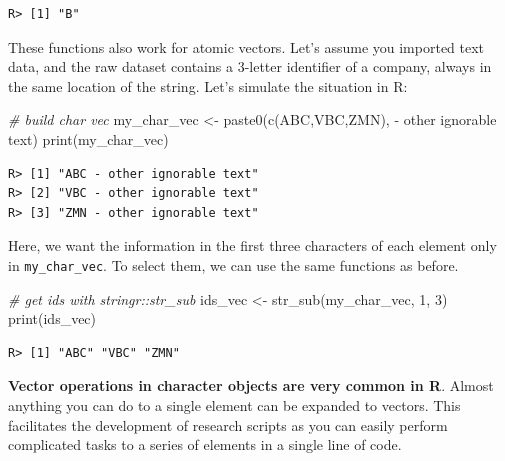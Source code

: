 \documentclass[
  12pt,
]{book}
\newenvironment{Shaded}{\begin{snugshade}}{\end{snugshade}}
\newcommand{\CommentTok}[1]{\textcolor[rgb]{0.37,0.37,0.37}{\textit{#1}}}
\newcommand{\DecValTok}[1]{\textcolor[rgb]{0.06,0.06,0.06}{#1}}
\newcommand{\FunctionTok}[1]{\textcolor[rgb]{0,0,0}{#1}}
\newcommand{\NormalTok}[1]{#1}
\newcommand{\OtherTok}[1]{\textcolor[rgb]{0.37,0.37,0.37}{#1}}
\newcommand{\StringTok}[1]{\textcolor[rgb]{0.5,0.5,0.5}{#1}}
\newenvironment{rmdimportant}
{\begin{importantblock}
		
	} {\end{importantblock}}
\begin{document}
\begin{verbatim}
R> [1] "B"
\end{verbatim}

These functions also work for atomic vectors. Let's assume you imported text data, and the raw dataset contains a 3-letter identifier of a company, always in the same location of the string. Let's simulate the situation in R:

\begin{Shaded}
\begin{Highlighting}[]
\CommentTok{\# build char vec}
\NormalTok{my\_char\_vec }\OtherTok{\textless{}{-}} \FunctionTok{paste0}\NormalTok{(}\FunctionTok{c}\NormalTok{(}\StringTok{\textquotesingle{}ABC\textquotesingle{}}\NormalTok{,}\StringTok{\textquotesingle{}VBC\textquotesingle{}}\NormalTok{,}\StringTok{\textquotesingle{}ZMN\textquotesingle{}}\NormalTok{),}
                      \StringTok{\textquotesingle{} {-} other ignorable text\textquotesingle{}}\NormalTok{)}
\FunctionTok{print}\NormalTok{(my\_char\_vec)}
\end{Highlighting}
\end{Shaded}

\begin{verbatim}
R> [1] "ABC - other ignorable text"
R> [2] "VBC - other ignorable text"
R> [3] "ZMN - other ignorable text"
\end{verbatim}

Here, we want the information in the first three characters of each element only in \texttt{my\_char\_vec}. To select them, we can use the same functions as before.

\begin{Shaded}
\begin{Highlighting}[]
\CommentTok{\# get ids with stringr::str\_sub}
\NormalTok{ids\_vec }\OtherTok{\textless{}{-}} \FunctionTok{str\_sub}\NormalTok{(my\_char\_vec, }\DecValTok{1}\NormalTok{, }\DecValTok{3}\NormalTok{)}
\FunctionTok{print}\NormalTok{(ids\_vec)}
\end{Highlighting}
\end{Shaded}

\begin{verbatim}
R> [1] "ABC" "VBC" "ZMN"
\end{verbatim}

\begin{rmdimportant}
\textbf{Vector operations in character objects are very common in R}.
Almost anything you can do to a single element can be expanded to
vectors. This facilitates the development of research scripts as you can
easily perform complicated tasks to a series of elements in a single
line of code.
\end{rmdimportant}
\end{document}
